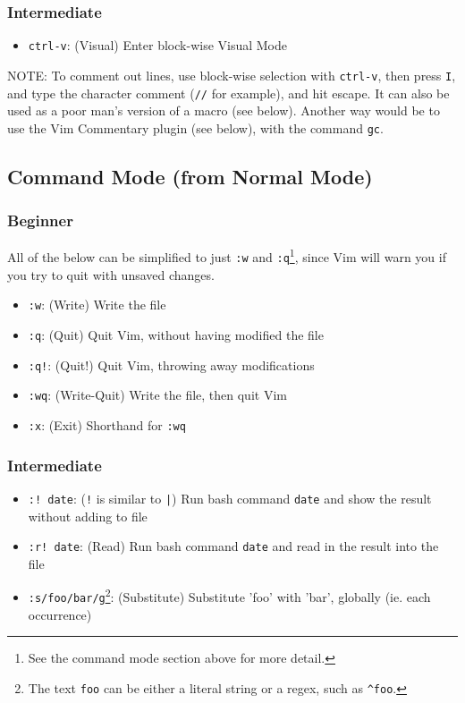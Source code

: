 \documentclass[11pt]{article}
\begin{document}
\subsubsection{Intermediate}
\label{sec:org49d833d}
\begin{itemize}
\item \texttt{ctrl-v}: (Visual) Enter block-wise Visual Mode
\end{itemize}

NOTE: To comment out lines, use block-wise selection with \texttt{ctrl-v}, then press
\texttt{I}, and type the character comment (\texttt{//} for example), and hit escape. It can
also be used as a poor man's version of a macro (see below). Another way would
be to use the Vim Commentary plugin (see below), with the command \texttt{gc}.
\subsection{Command Mode (from Normal Mode)}
\label{sec:orgd5ba8d8}
\subsubsection{Beginner}
\label{sec:orga2c907b}
All of the below can be simplified to just \texttt{:w} and \texttt{:q}\footnote{See the command mode section above for more detail.}, since Vim will warn
you if you try to quit with unsaved changes.

\begin{itemize}
\item \texttt{:w}: (Write) Write the file
\item \texttt{:q}: (Quit) Quit Vim, without having modified the file
\item \texttt{:q!}: (Quit!) Quit Vim, throwing away modifications
\item \texttt{:wq}: (Write-Quit) Write the file, then quit Vim
\item \texttt{:x}: (Exit) Shorthand for \texttt{:wq}
\end{itemize}
\subsubsection{Intermediate}
\label{sec:orgcf5703f}
\begin{itemize}
\item \texttt{:! date}: (\texttt{!} is similar to \texttt{|}) Run bash command \texttt{date} and show the result without adding to file
\item \texttt{:r! date}: (Read) Run bash command \texttt{date} and read in the result into the file
\item \texttt{:s/foo/bar/g}\footnote{The text \texttt{foo} can be either a literal string or a regex, 
such as \texttt{\textasciicircum{}foo}.}: (Substitute) Substitute 'foo' with 'bar', globally (ie. each occurrence)
\end{itemize}
\end{document}
